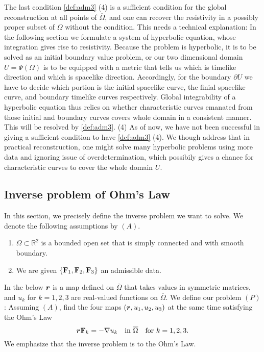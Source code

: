 \documentclass[11pt]{amsart}
\theoremstyle{plain}
\theoremstyle{remark}
\numberwithin{equation}{section}
\numberwithin{Thm}{section}
\def\F{{\bf F}}
\def\r{{\bf r}}
\def\r{\mbox{\boldmath$r$}}
\begin{document}
The last condition \ref{def:adm3} (4) is a sufficient condition for the global reconstruction at all points of $\overline\Omega$, and one can recover the resistivity in a possibly proper subset of $\Omega$ without the condition. This needs a technical explanation: In the following section we formulate a system of hyperbolic equation, whose integration gives rise to resistivity. Because the problem is hyperbolic, it is to be solved as an initial boundary value problem, or our two dimensional domain $U=\Psi(\Omega)$ is to be equipped with a metric that tells us which is timelike direction and which is spacelike direction. Accordingly, for the boundary $\partial U$ we have to  decide which portion is the initial spacelike curve, the finial spacelike curve, and boundary timelike curves respectively. Global integrability of a hyperbolic equation thus relies on whether characteristic curves emanated from those initial and boundary curves covers whole domain in a consistent manner. This will be resolved by \ref{def:adm3}. (4) As of now, we have not been successful in giving a sufficient condition to have \ref{def:adm3} (4). We though address that in practical reconstruction, one might solve many hyperbolic problems using more data and ignoring issue of overdetermination, which possibily gives a chance for characteristic curves to cover the whole domain $U$.

\subsection{Inverse problem of Ohm's Law} \label{sec:inv}
In this section, we precisely define the inverse problem we want to solve. We denote the following assumptions by $(A)$.
\begin{enumerate} 
 \item $\Omega \subset \mathbb{R}^2$ is a bounded open set that is simply connected and with smooth boundary.
 \item We are given $\{\F_1, \F_2, \F_3\}$ an admissible data.
\end{enumerate}
In the below $\r$ is a map defined on $\overline\Omega$ that takes values in symmetric matrices, and $u_k$ for $k=1,2,3$ are real-valued functions on $\overline\Omega$. We define our problem $(P)$: Assuming $(A)$, find the four maps $(\r,u_1,u_2,u_3)$ at the same time satisfying the Ohm's Law 
\begin{equation}
\r\F_k = -\nabla u_k \quad \text{in $\overline\Omega$} \quad \text{for $k=1,2,3$}. \label{myohms} 
\end{equation}
We emphasize that the inverse problem is to the Ohm's Law.%
\end{document}

